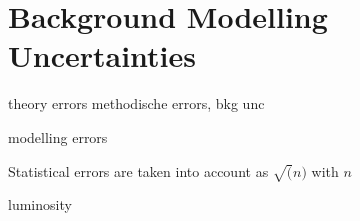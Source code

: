 

\subsection{}

\section{Background Modelling Uncertainties}






theory errors
methodische errors, bkg unc


modelling errors

Statistical errors are taken into account as $\sqrt(n)$ with $n$

luminosity

